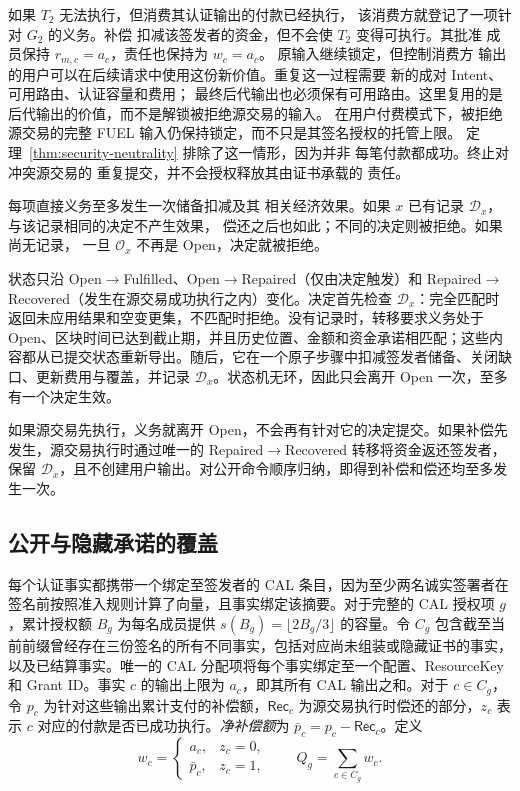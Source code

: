 如果 $T_2$ 无法执行，但消费其认证输出的付款已经执行，
该消费方就登记了一项针对 $G_2$ 的义务。补偿
扣减该签发者的资金，但不会使 $T_2$ 变得可执行。其批准
成员保持 $r_{m,c}=a_c$，责任也保持为 $w_c=a_c$。
原输入继续锁定，但控制消费方
输出的用户可以在后续请求中使用这份新价值。重复这一过程需要
新的成对 Intent、可用路由、认证容量和费用；
最终后代输出也必须保有可用路由。这里复用的是
后代输出的价值，而不是解锁被拒绝源交易的输入。
在用户付费模式下，被拒绝源交易的完整
FUEL 输入仍保持锁定，而不只是其签名授权的托管上限。
定理~\ref{thm:security-neutrality} 排除了这一情形，因为并非
每笔付款都成功。终止对冲突源交易的
重复提交，并不会授权释放其由证书承载的
责任。

\begin{lemma}[补偿至多生效一次]
\label{lem:security-decision}
每项直接义务至多发生一次储备扣减及其
相关经济效果。如果 $x$ 已有记录
$\mathcal D_x$，与该记录相同的决定不产生效果，
偿还之后也如此；不同的决定则被拒绝。如果尚无记录，
一旦 $\mathcal O_x$ 不再是 Open，决定就被拒绝。
\end{lemma}
\begin{IEEEproof}
状态只沿 Open$\to$Fulfilled、Open$\to$Repaired（仅由决定触发）和 Repaired$\to$Recovered（发生在源交易成功执行之内）变化。决定首先检查 $\mathcal D_x$：完全匹配时返回未应用结果和空变更集，不匹配时拒绝。没有记录时，转移要求义务处于 Open、区块时间已达到截止期，并且历史位置、金额和资金承诺相匹配；这些内容都从已提交状态重新导出。随后，它在一个原子步骤中扣减签发者储备、关闭缺口、更新费用与覆盖，并记录 $\mathcal D_x$。状态机无环，因此只会离开 Open 一次，至多有一个决定生效。

如果源交易先执行，义务就离开 Open，不会再有针对它的决定提交。如果补偿先发生，源交易执行时通过唯一的 Repaired$\to$Recovered 转移将资金返还签发者，保留 $\mathcal D_x$，且不创建用户输出。对公开命令顺序归纳，即得到补偿和偿还均至多发生一次。
\end{IEEEproof}

\subsection{公开与隐藏承诺的覆盖}
\label{sec:security-coverage}

每个认证事实都携带一个绑定至签发者的 CAL 条目，因为至少两名诚实签署者在签名前按照准入规则计算了向量，且事实绑定该摘要。对于完整的 CAL 授权项 $g$，累计授权额 $B_g$ 为每名成员提供 $s(B_g)=\lfloor2B_g/3\rfloor$ 的容量。令 $C_g$ 包含截至当前前缀曾经存在三份签名的所有不同事实，包括对应尚未组装或隐藏证书的事实，以及已结算事实。唯一的 CAL 分配项将每个事实绑定至一个配置、ResourceKey 和 Grant ID。事实 $c$ 的输出上限为 $a_c$，即其所有 CAL 输出之和。对于 $c\in C_g$，令 $p_c$ 为针对这些输出累计支付的补偿额，$\mathsf{Rec}_c$ 为源交易执行时偿还的部分，$z_c$ 表示 $c$ 对应的付款是否已成功执行。\emph{净补偿额}为 $\bar p_c=p_c-\mathsf{Rec}_c$。定义
\begin{equation}
  w_c=\begin{cases}a_c,&z_c=0,\\\bar p_c,&z_c=1,\end{cases}
  \qquad Q_g=\sum_{c\in C_g}w_c.
  \label{eq:security-risk}
\end{equation}

